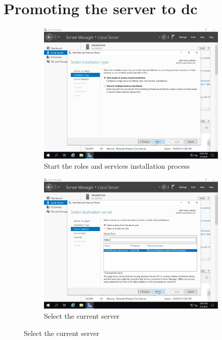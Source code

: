 \section{Promoting the server to \acrshort{dc}}
\begin{figure}[!htb]
	\begin{subfigure}{0.5\textwidth}
		\captionsetup{width=0.8\linewidth}
		\includegraphics[width=0.9\linewidth]{img/Methodologie/Migration15.png}
		\centering
		\caption{Start the roles and services installation process}
	\end{subfigure}
	\begin{subfigure}{0.5\textwidth}
		\captionsetup{width=0.8\linewidth}
		\includegraphics[width=0.9\linewidth]{img/Methodologie/Migration16.png} 
		\centering
		\caption{Select the current server}
	\end{subfigure}
\end{figure}
